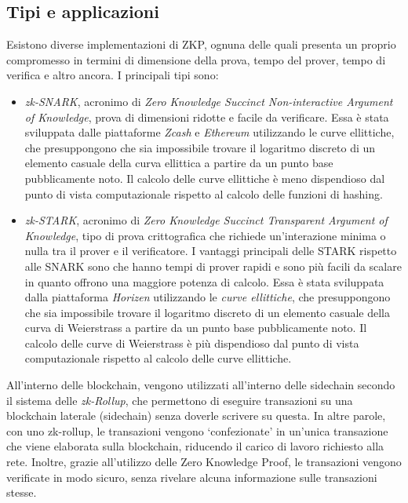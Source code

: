 \subsection{Tipi e applicazioni}\label{sec:zero-knowledge-proof-tipi-applicazioni}
Esistono diverse implementazioni di ZKP, ognuna delle quali presenta un proprio compromesso in termini di dimensione della prova, tempo del prover, tempo di verifica e altro ancora. 
I principali tipi sono: 
\begin{itemize}
    \item{\textit{zk-SNARK}}, acronimo di \textit{Zero Knowledge Succinct Non-interactive Argument of Knowledge}, prova di dimensioni ridotte e facile da verificare. Essa è stata sviluppata dalle piattaforme \textit{Zcash} e \textit{Ethereum} 
    utilizzando le curve ellittiche, che presuppongono che sia impossibile trovare il logaritmo discreto di un elemento casuale della curva ellittica a partire da un punto base pubblicamente noto. Il calcolo delle curve ellittiche è meno dispendioso dal punto di vista computazionale rispetto al calcolo delle funzioni di hashing.
    \item{\textit{zk-STARK}}, acronimo di \textit{Zero Knowledge Succinct Transparent Argument of Knowledge}, tipo di prova crittografica che richiede un'interazione minima o nulla tra il prover e il verificatore. I vantaggi principali delle STARK rispetto alle SNARK sono che hanno tempi di prover rapidi e sono più facili da scalare in quanto offrono una maggiore potenza di calcolo.
    Essa è stata sviluppata dalla piattaforma \textit{Horizen} utilizzando le \textit{curve ellittiche}, che presuppongono che sia impossibile trovare il logaritmo discreto di un elemento casuale della curva di Weierstrass a partire da un punto base pubblicamente noto. Il calcolo delle curve di Weierstrass è più dispendioso dal punto di vista computazionale rispetto al calcolo delle curve ellittiche.
\end{itemize}

All'interno delle blockchain, vengono utilizzati all'interno delle sidechain secondo il sistema delle \textit{zk-Rollup}, che permettono di eseguire transazioni su una blockchain laterale (sidechain) senza doverle scrivere su questa.
In altre parole, con uno zk-rollup, le transazioni vengono `confezionate' in un'unica transazione che viene elaborata sulla blockchain, riducendo il carico di lavoro richiesto alla rete. 
Inoltre, grazie all'utilizzo delle Zero Knowledge Proof, le transazioni vengono verificate in modo sicuro, senza rivelare alcuna informazione sulle transazioni stesse.

